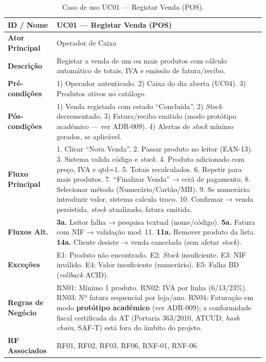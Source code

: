 \begin{table}[H]
\centering\small
\begin{tabular}{|p{3cm}|p{11cm}|}
\hline
\textbf{ID / Nome} & UC01 --- Registar Venda (POS) \\
\hline
\textbf{Ator Principal} & Operador de Caixa \\
\hline
\textbf{Descrição} & Registar a venda de um ou mais produtos com cálculo automático de totais, IVA e emissão de fatura/recibo. \\
\hline
\textbf{Pré-condições} & 1) Operador autenticado. 2) Caixa do dia aberta (UC04). 3) Produtos ativos no catálogo. \\
\hline
\textbf{Pós-condições} & 1) Venda registada com estado ``Concluída''. 2) \textit{Stock} decrementado. 3) Fatura/recibo emitido (modo protótipo académico --- ver ADR-009). 4) Alertas de \textit{stock} mínimo gerados, se aplicável. \\
\hline
\textbf{Fluxo Principal} & 1. Clicar ``Nova Venda''. 2. Passar produto no leitor (EAN-13). 3. Sistema valida código e \textit{stock}. 4. Produto adicionado com preço, IVA e qtd=1. 5. Totais recalculados. 6. Repetir para mais produtos. 7. ``Finalizar Venda'' → ecrã de pagamento. 8. Selecionar método (Numerário/Cartão/MB). 9. Se numerário: introduzir valor, sistema calcula troco. 10. Confirmar → venda persistida, \textit{stock} atualizado, fatura emitida. \\
\hline
\textbf{Fluxos Alt.} & \textbf{3a.} Leitor falha → pesquisa textual (nome/código). \textbf{5a.} Fatura com NIF → validação mod~11. \textbf{11a.} Remover produto da lista. \textbf{14a.} Cliente desiste → venda cancelada (sem afetar \textit{stock}). \\
\hline
\textbf{Exceções} & E1: Produto não encontrado. E2: \textit{Stock} insuficiente. E3: NIF inválido. E4: Valor insuficiente (numerário). E5: Falha BD (\textit{rollback} ACID). \\
\hline
\textbf{Regras de Negócio} & RN01: Mínimo 1 produto. RN02: IVA por linha (6/13/23\%). RN03: Nº fatura sequencial por loja/ano. RN04: Faturação em modo \textbf{protótipo académico} (ver ADR-009); a conformidade fiscal certificada da AT (Portaria 363/2010, ATCUD, \textit{hash chain}, SAF-T) está fora do âmbito do projeto. \\
\hline
\textbf{RF Associados} & RF01, RF02, RF03, RF06, RNF-01, RNF-06 \\
\hline
\end{tabular}
\caption{Caso de uso UC01 --- Registar Venda (POS).}
\end{table}


